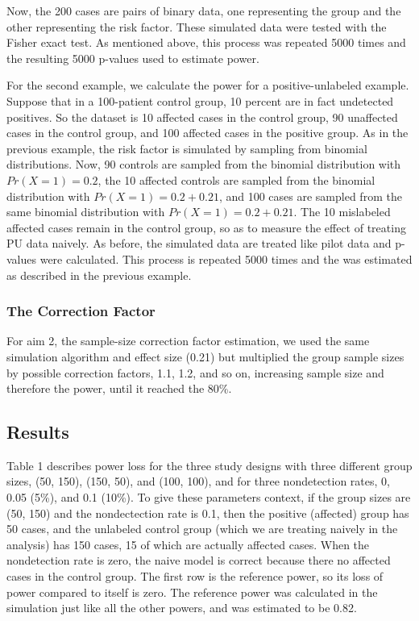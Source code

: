 \documentclass[
]{article}
\begin{document}
Now, the 200 cases are pairs of binary data, one representing the group
and the other representing the risk factor. These simulated data were
tested with the Fisher exact test. As mentioned above, this process was
repeated 5000 times and the resulting 5000 p-values used to estimate
power.

For the second example, we calculate the power for a positive-unlabeled
example. Suppose that in a 100-patient control group, 10 percent are in
fact undetected positives. So the dataset is 10 affected cases in the
control group, 90 unaffected cases in the control group, and 100
affected cases in the positive group. As in the previous example, the
risk factor is simulated by sampling from binomial distributions. Now,
90 controls are sampled from the binomial distribution with
\(Pr(X=1) = 0.2\), the 10 affected controls are sampled from the
binomial distribution with \(Pr(X=1) = 0.2+ 0.21\), and 100 cases are
sampled from the same binomial distribution with
\(Pr(X=1) = 0.2 + 0.21\). The 10 mislabeled affected cases remain in the
control group, so as to measure the effect of treating PU data naively.
As before, the simulated data are treated like pilot data and p-values
were calculated. This process is repeated 5000 times and the was
estimated as described in the previous example.

\hypertarget{the-correction-factor}{%
\subsubsection{The Correction Factor}\label{the-correction-factor}}

For aim 2, the sample-size correction factor estimation, we used the
same simulation algorithm and effect size (0.21) but multiplied the
group sample sizes by possible correction factors, 1.1, 1.2, and so on,
increasing sample size and therefore the power, until it reached the
80\%.

\pagebreak

\hypertarget{results-1}{%
\subsection{Results}\label{results-1}}

Table 1 describes power loss for the three study designs with three
different group sizes, (50, 150), (150, 50), and (100, 100), and for
three nondetection rates, 0, 0.05 (5\%), and 0.1 (10\%). To give these
parameters context, if the group sizes are (50, 150) and the
nondectection rate is 0.1, then the positive (affected) group has 50
cases, and the unlabeled control group (which we are treating naively in
the analysis) has 150 cases, 15 of which are actually affected cases.
When the nondetection rate is zero, the naive model is correct because
there no affected cases in the control group. The first row is the
reference power, so its loss of power compared to itself is zero. The
reference power was calculated in the simulation just like all the other
powers, and was estimated to be 0.82.
\end{document}
